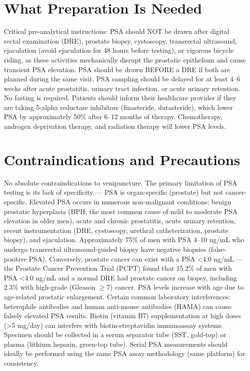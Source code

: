 \section*{What Preparation Is Needed}
Critical pre-analytical instructions: PSA should NOT be drawn after digital rectal examination (DRE), prostate biopsy, cystoscopy, transrectal ultrasound, ejaculation (avoid ejaculation for 48 hours before testing), or vigorous bicycle riding, as these activities mechanically disrupt the prostatic epithelium and cause transient PSA elevation. PSA should be drawn BEFORE a DRE if both are planned during the same visit. PSA sampling should be delayed for at least 4--6 weeks after acute prostatitis, urinary tract infection, or acute urinary retention. No fasting is required. Patients should inform their healthcare provider if they are taking 5-alpha reductase inhibitors (finasteride, dutasteride), which lower PSA by approximately 50\% after 6--12 months of therapy. Chemotherapy, androgen deprivation therapy, and radiation therapy will lower PSA levels.

\section*{Contraindications and Precautions}
No absolute contraindications to venipuncture. The primary limitation of PSA testing is its lack of specificity --- PSA is organ-specific (prostate) but not cancer-specific. Elevated PSA occurs in numerous non-malignant conditions: benign prostatic hyperplasia (BPH, the most common cause of mild to moderate PSA elevation in older men), acute and chronic prostatitis, acute urinary retention, recent instrumentation (DRE, cystoscopy, urethral catheterization, prostate biopsy), and ejaculation. Approximately 75\% of men with PSA 4--10 ng/mL who undergo transrectal ultrasound-guided biopsy have negative biopsies (false-positive PSA). Conversely, prostate cancer can exist with a PSA <4.0 ng/mL --- the Prostate Cancer Prevention Trial (PCPT) found that 15.2\% of men with PSA <4.0 ng/mL and a normal DRE had prostate cancer on biopsy, including 2.3\% with high-grade (Gleason $\geq$7) cancer. PSA levels increase with age due to age-related prostatic enlargement. Certain common laboratory interferences: heterophile antibodies and human anti-mouse antibodies (HAMA) can cause falsely elevated PSA results. Biotin (vitamin B7) supplementation at high doses (>5 mg/day) can interfere with biotin-streptavidin immunoassay systems. Specimen should be collected in a serum separator tube (SST, gold-top) or plasma (lithium heparin, green-top tube). Serial PSA measurements should ideally be performed using the same PSA assay methodology (same platform) for consistency.

